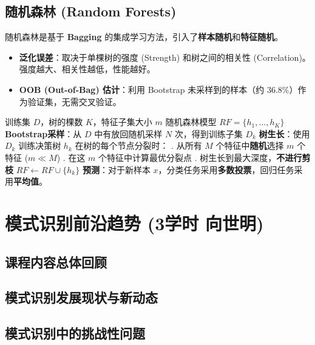 \documentclass[a4paper, 11pt]{ctexart}
\begin{document}
\subsection{随机森林 (Random Forests)}
随机森林是基于 \textbf{Bagging} 的集成学习方法，引入了\textbf{样本随机}和\textbf{特征随机}。

\begin{itemize}
    \item \textbf{泛化误差}：取决于单棵树的强度 (Strength) 和树之间的相关性 (Correlation)。强度越大、相关性越低，性能越好。
    \item \textbf{OOB (Out-of-Bag) 估计}：利用 Bootstrap 未采样到的样本（约 36.8\%）作为验证集，无需交叉验证。
\end{itemize}

\begin{algorithm}[H]
    \caption{随机森林构建算法}
    \begin{algorithmic}[1]
    \Require 训练集 $D$，树的棵数 $K$，特征子集大小 $m$
    \Ensure 随机森林模型 $RF = \{h_1, \dots, h_K\}$
        \State \textbf{Bootstrap采样}：从 $D$ 中有放回随机采样 $N$ 次，得到训练子集 $D_k$
        \State \textbf{树生长}：使用 $D_k$ 训练决策树 $h_k$
        \State 在树的每个节点分裂时：
        \State {}. 从所有 $M$ 个特征中\textbf{随机}选择 $m$ 个特征 ($m \ll M$)
        \State {}. 在这 $m$ 个特征中计算最优分裂点
        \State {}. 树生长到最大深度，\textbf{不进行剪枝}
        \State $RF \gets RF \cup \{h_k\}$
    \EndFor
    \State \textbf{预测}：对于新样本 $x$，分类任务采用\textbf{多数投票}，回归任务采用\textbf{平均值}。
    \end{algorithmic}
\end{algorithm}

\newpage
\section{模式识别前沿趋势 \small{(3学时 向世明)}}
\subsection{课程内容总体回顾}
\subsection{模式识别发展现状与新动态}
\subsection{模式识别中的挑战性问题}
\end{document}
